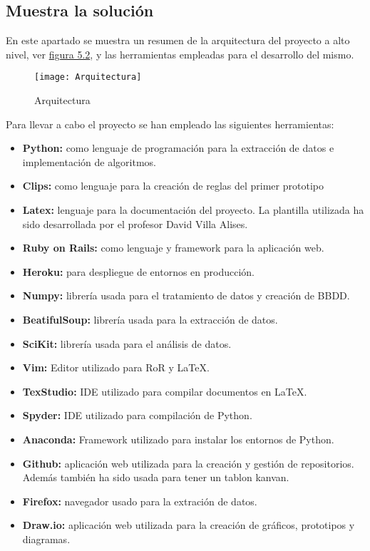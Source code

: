 \subsection{Muestra la solución}
En este apartado se muestra un resumen de la arquitectura del proyecto a alto nivel, ver \hyperref[fig:Arquitectura proyecto]{figura 5.2}, y las herramientas empleadas para el desarrollo del mismo.

\begin{figure}[htb]
  \centering
    \texttt{[image: Arquitectura]}
  \caption[Arquitectura]{Arquitectura}
  \label{fig:Arquitectura proyecto}
\end{figure}


Para llevar a cabo el proyecto se han empleado las siguientes herramientas:
\begin{itemize}
  \item \textbf{Python:} como lenguaje de programación para la extracción de datos e implementación
    de algoritmos.
  \item \textbf{Clips:} como lenguaje para la creación de reglas del primer prototipo
  \item \textbf{Latex:} lenguaje para la documentación del proyecto. La plantilla utilizada
    ha sido desarrollada por el profesor David Villa Alises.
  \item \textbf{Ruby on Rails:} como lenguaje y framework para la aplicación web.
  \item \textbf{Heroku:} para despliegue de entornos en producción.
  \item \textbf{Numpy:} librería usada para el tratamiento de datos y creación de \acl{BBDD}.
  \item \textbf{BeatifulSoup:} librería usada para la extracción de datos.
  \item \textbf{SciKit:} librería usada para el análisis de datos.
  \item \textbf{Vim:} Editor utilizado para RoR y LaTeX.
  \item \textbf{TexStudio:} IDE utilizado para compilar documentos en LaTeX.
  \item \textbf{Spyder:} IDE utilizado para compilación de Python.
  \item \textbf{Anaconda:} Framework utilizado para instalar los entornos de Python.
  \item \textbf{Github:} aplicación web utilizada para la creación y gestión de repositorios.
    Además también ha sido usada para tener un tablon kanvan.
  \item \textbf{Firefox:} navegador usado para la extración de datos.
  \item \textbf{Draw.io:} aplicación web utilizada para la creación de gráficos, prototipos
    y diagramas.
\end{itemize}

